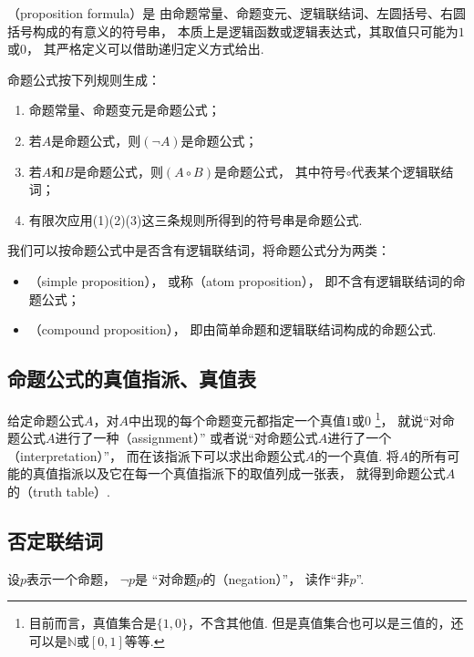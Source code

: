 （proposition formula）是
由命题常量、命题变元、逻辑联结词、左圆括号、右圆括号构成的有意义的符号串，
本质上是逻辑函数或逻辑表达式，其取值只可能为\(1\)或\(0\)，
其严格定义可以借助递归定义方式给出.
\begin{definition}
命题公式按下列规则生成：\begin{enumerate}[label={(\arabic*)}]
	\item 命题常量、命题变元是命题公式；
	\item 若\(A\)是命题公式，则\((\neg A)\)是命题公式；
	\item 若\(A\)和\(B\)是命题公式，则\((A \circ B)\)是命题公式，
	其中符号\(\circ\)代表某个逻辑联结词；
	\item 有限次应用(1)(2)(3)这三条规则所得到的符号串是命题公式.
\end{enumerate}
\end{definition}

我们可以按命题公式中是否含有逻辑联结词，将命题公式分为两类：\begin{itemize}
	\item {}（simple proposition），
	或称（atom proposition），
	即不含有逻辑联结词的命题公式；
	\item {}（compound proposition），
	即由简单命题和逻辑联结词构成的命题公式.
\end{itemize}

\subsection{命题公式的真值指派、真值表}
给定命题公式\(A\)，对\(A\)中出现的每个命题变元都指定一个真值\(1\)或\(0\)
\footnote{
	目前而言，真值集合是\(\{1,0\}\)，不含其他值.
	但是真值集合也可以是三值的，还可以是\(\mathbb{N}\)或\([0,1]\)等等.
}，
就说“对命题公式\(A\)进行了一种（assignment）”
或者说“对命题公式\(A\)进行了一个（interpretation）”，
而在该指派下可以求出命题公式\(A\)的一个真值.
将\(A\)的所有可能的真值指派以及它在每一个真值指派下的取值列成一张表，
就得到命题公式\(A\)的（truth table）.

\subsection{否定联结词}
设\(p\)表示一个命题，
\(\neg p\)是
“对命题\(p\)的（negation）”，
读作“非\(p\)”.

